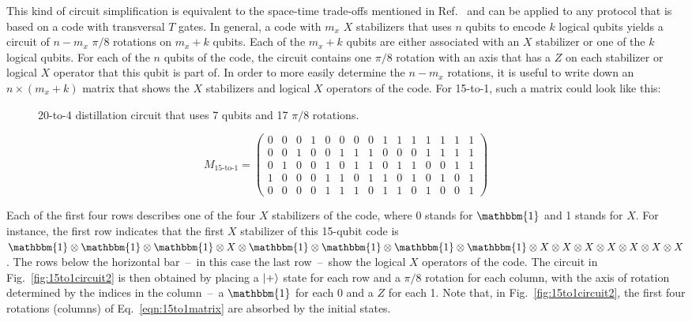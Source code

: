 \documentclass[prx,aps,letterpaper,twocolumn,allowfontchageintitle=true,accepted=2019-02-01]{quantumarticle}
\begin{document}
\setcounter{MaxMatrixCols}{25}
\setlength\arraycolsep{2pt}

This kind of circuit simplification is equivalent to the space-time trade-offs mentioned in Ref.~\cite{Haah2018} and can be applied to any protocol that is based on a code with transversal $T$ gates. In general, a code with $m_x$ $X$ stabilizers that uses $n$ qubits to encode $k$ logical qubits yields a circuit of $n-m_x$ $\pi/8$ rotations on $m_x+k$ qubits. Each of the $m_x+k$ qubits are either associated with an $X$ stabilizer or one of the $k$ logical qubits. For each of the $n$ qubits of the code, the circuit contains one $\pi/8$ rotation with an axis that has a $Z$ on each stabilizer or logical $X$ operator that this qubit is part of. In order to more easily determine the $n-m_x$ rotations, it is useful to write down an $n \times (m_x+k)$ matrix that shows the $X$ stabilizers and logical $X$ operators of the code. For 15-to-1, such a matrix could look like this:

\begin{figure}[t!]
\centering
\def\svgwidth{0.97\linewidth}

\caption{20-to-4 distillation circuit that uses 7 qubits and 17 $\pi/8$ rotations.}
\label{fig:20to4circuit}
\end{figure}

\begin{equation}
M_{\text{15-to-1}} = 
\begin{pmatrix}
	0 & 0 & 0 & 1 & 0 & 0 & 0 & 0 & 1 & 1 & 1 & 1 & 1 & 1 & 1 \\
	0 & 0 & 1 & 0 & 0 & 1 & 1 & 1 & 0 & 0 & 0 & 1 & 1 & 1 & 1 \\
	0 & 1 & 0 & 0 & 1 & 0 & 1 & 1 & 0 & 1 & 1 & 0 & 0 & 1 & 1 \\
	1 & 0 & 0 & 0 & 1 & 1 & 0 & 1 & 1 & 0 & 1 & 0 & 1 & 0 & 1 \\
	\hline
	0 & 0 & 0 & 0 & 1 & 1 & 1 & 0 & 1 & 1 & 0 & 1 & 0 & 0 & 1
\end{pmatrix}
\label{eqn:15to1matrix}
\end{equation}

Each of the first four rows describes one of the four $X$ stabilizers of the code, where 0 stands for $\mathbbm{1}$ and 1 stands for $X$. For instance, the first row indicates that the first $X$ stabilizer of this 15-qubit code is $\mathbbm{1} \otimes\mathbbm{1} \otimes\mathbbm{1} \otimes X \otimes \mathbbm{1} \otimes\mathbbm{1} \otimes\mathbbm{1} \otimes\mathbbm{1} \otimes X  \otimes X\otimes X\otimes X\otimes X\otimes X\otimes X$. The rows below the horizontal bar~--~in this case the last row~--~show the logical $X$ operators of the code. The circuit in Fig.~\ref{fig:15to1circuit2} is then obtained by placing a $\ket{+}$ state for each row and a $\pi/8$ rotation for each column, with the axis of rotation determined by the indices in the column~--~a $\mathbbm{1}$ for each 0 and a $Z$ for each 1. Note that, in Fig.~\ref{fig:15to1circuit2}, the first four rotations (columns) of Eq.~\eqref{eqn:15to1matrix} are absorbed by the initial states.
\end{document}
